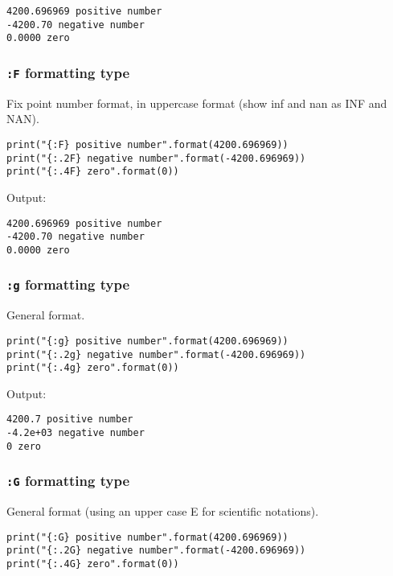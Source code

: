 \documentclass[11pt]{article}
\begin{document}
\begin{verbatim}
4200.696969 positive number
-4200.70 negative number
0.0000 zero
\end{verbatim}

\subsubsection{\texttt{:F} formatting type}
\label{sec:org7ebd072}
Fix point number format, in uppercase format (show inf and nan as INF and NAN).

\begin{verbatim}
print("{:F} positive number".format(4200.696969))
print("{:.2F} negative number".format(-4200.696969))
print("{:.4F} zero".format(0))
\end{verbatim}

 \noindent Output:

\begin{verbatim}
4200.696969 positive number
-4200.70 negative number
0.0000 zero
\end{verbatim}

\subsubsection{\texttt{:g} formatting type}
\label{sec:org5e6b83e}
General format.

\begin{verbatim}
print("{:g} positive number".format(4200.696969))
print("{:.2g} negative number".format(-4200.696969))
print("{:.4g} zero".format(0))
\end{verbatim}

 \noindent Output:

\begin{verbatim}
4200.7 positive number
-4.2e+03 negative number
0 zero
\end{verbatim}

\subsubsection{\texttt{:G} formatting type}
\label{sec:org05d4503}
General format (using an upper case E for scientific notations).

\begin{verbatim}
print("{:G} positive number".format(4200.696969))
print("{:.2G} negative number".format(-4200.696969))
print("{:.4G} zero".format(0))
\end{verbatim}
\end{document}
